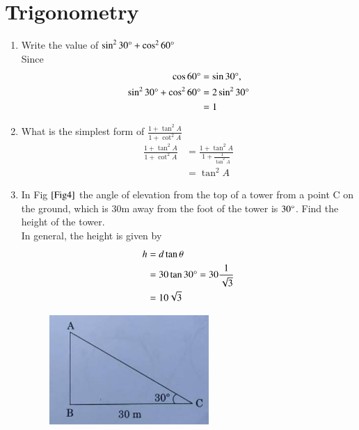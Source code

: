 \documentclass[journal,12pt,twocolumn]{IEEEtran}
\renewcommand\thesection{\arabic{section}}
\begin{document}
\section{Trigonometry}
\begin{enumerate}[label=\thesection.\arabic*.,ref=\thesection.\theenumi]
\item Write the value of $\sin^2 30\degree + \cos^2 60\degree$\\
	\solution Since 
  \begin{align}
	  \cos 60\degree &= \sin 30\degree, 
	  \\
	  \sin^2 30\degree + \cos^2 60\degree &= 
2\sin^2 30\degree 
\\
	  &=1
  \end{align}
\item What is the simplest form of $\frac{1 + \tan^2 A}{1 + \cot^2 A}$\\
	\solution
		\begin{align}
			\frac{1 + \tan^2 A}{1 + \cot^2 A} 
			&=\frac{1 + \tan^2 A}{1 + \frac{1}{\tan^2 A}} 
			\\
			&=\tan^2 A
		\end{align}
\item In Fig $\ref{Fig4}$ the angle of elevation from the top of a tower from a point C on the ground, which is 30m away from the foot of the tower is $30\degree$. Find the height of the tower.\\
	\solution In general, the height is given by 
  \begin{align}
	  h &= d \tan \theta
	  \\
	  &= 30 \tan 30 \degree = 30 \frac{1}{\sqrt{3}}
	  \\
	  &= 10 \sqrt{3}
  \end{align}

\begin{figure}[h!]
    \centering
    \includegraphics[width=0.5\columnwidth]{Fig4.png}
	\caption{}
	\label{Fig4}
 \end{figure}


\end{enumerate}
\end{document}
